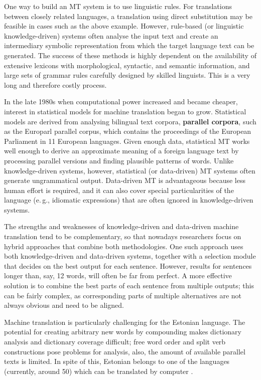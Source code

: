\documentclass[]{../metanetpaper}
\begin{document}
\begin{multicols}{2}
One way to build an MT system is to use linguistic rules. For translations between closely related languages, a translation using direct substitution may be feasible in cases such as the above example. However, rule-based (or linguistic knowledge-driven) systems often analyse the input text and create an intermediary symbolic representation from which the target language text can be generated. The success of these methods is highly dependent on the availability of extensive lexicons with morphological, syntactic, and semantic information, and large sets of grammar rules carefully designed by skilled linguists. This is a very long and therefore costly process.

In the late 1980s when computational power increased and became cheaper, interest in statistical models for machine translation began to grow. Statistical models are derived from analysing bilingual text corpora, \textbf{parallel corpora}, such as the Europarl parallel corpus, which contains the proceedings of the European Parliament in 11 European languages. Given enough data, statistical MT works well enough to derive an approximate meaning of a foreign language text by processing parallel versions and finding plausible patterns of words. Unlike knowledge-driven systems, however, statistical (or data-driven) MT systems often generate ungrammatical output. Data-driven MT is advantageous because less human effort is required, and it can also cover special particularities of the language (e.\,g., idiomatic expressions) that are often ignored in knowledge-driven systems. 

The strengths and weaknesses of knowledge-driven and data-driven machine translation tend to be complementary, so that nowadays researchers focus on hybrid approaches that combine both methodologies. One such approach uses both knowledge-driven and data-driven systems, together with a selection module that decides on the best output for each sentence. However, results for sentences longer than, say, 12 words, will often be far from perfect. A more effective solution is to combine the best parts of each sentence from multiple outputs; this can be fairly complex, as corresponding parts of multiple alternatives are not always obvious and need to be aligned. 


Machine translation is particularly challenging for the Estonian language. 
The potential for creating arbitrary new words by compounding makes dictionary analysis and dictionary coverage difficult; free word order and split verb constructions pose problems for analysis, also, the amount of available parallel texts is limited. 
In spite of this, Estonian belongs to one of the languages (currently, around 50) which can be translated by computer \cite{Koit}. 


\end{multicols}
\end{document}
